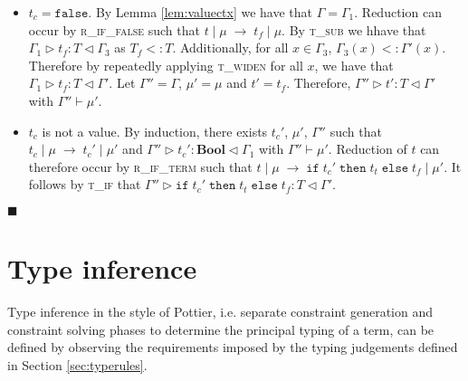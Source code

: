 \documentclass{article}
\newcommand{\lemref}[1]{Lemma \ref{#1}}
\newcommand{\rifexpr}{\textsc{r\_if\_term} }
\newcommand{\riffalse}{\textsc{r\_if\_false} }
\newcommand{\tif}{\textsc{t\_if} }
\newcommand{\tsub}{\textsc{t\_sub} }
\newcommand{\twiden}{\textsc{t\_widen} }
\newcommand{\typerule}[4]{#1 \triangleright #2 : #3 \triangleleft #4}
\newcommand{\oprule}[4]{#1 \mid #2\;\longrightarrow\;#3 \mid #4}
\newcommand{\falsev}{\mathtt{false}}
\newcommand{\boolt}{\mathbf{Bool}}
\newcommand{\ift}[3]{\mathtt{if} \; #1 \; \mathtt{then} \; #2 \; \mathtt{else} \; #3}
\newcommand{\qed}{$\blacksquare$}
\newenvironment{proof}{\vspace{1ex}\noindent{\bf Proof}\hspace{0.5em}}
  {\hfill\qed\vspace{1ex}}
\begin{document}
\begin{proof}
\begin{itemize}
\begin{itemize}
	\item $t_c = \falsev$. By \lemref{lem:valuectx} we have that
	$\Gamma = \Gamma_1$. Reduction can occur by \riffalse such that
	$\oprule{t}{\mu}{t_f}{\mu}$. By \tsub we hhave that
	$\typerule{\Gamma_1}{t_f}{T}{\Gamma_3}$ as $T_f <: T$. Additionally, for
	all $x \in \Gamma_3$, $\Gamma_3(x) <: \Gamma'(x)$. Therefore by
	repeatedly applying \twiden for all $x$, we have that
	$\typerule{\Gamma_1}{t_f}{T}{\Gamma'}$. Let $\Gamma'' = \Gamma$,
	$\mu' = \mu$ and $t' = t_f$. Therefore, 
	$\typerule{\Gamma''}{t'}{T}{\Gamma'}$ with $\Gamma'' \vdash \mu'$.

	\item $t_c$ is not a value. By induction, there exists $t_c'$,
	$\mu'$, $\Gamma''$ such that 
	$\oprule{t_c}{\mu}{t_c'}{\mu'}$ and 
	$\typerule{\Gamma''}{t_c'}{\boolt}{\Gamma_1}$ with $\Gamma'' \vdash \mu'$. 
	Reduction of $t$ can therefore occur by \rifexpr such that
	$\oprule{t}{\mu}{\ift{t_c'}{t_t}{t_f}}{\mu'}$. It follows
	by \tif that $\typerule{\Gamma''}{\ift{t_c'}{t_t}{t_f}}{T}{\Gamma'}$.
	\end{itemize}

\end{itemize}
\end{proof}

\section{Type inference}

Type inference in the style of Pottier, i.e. separate constraint generation
and constraint solving phases to determine the principal typing of a term,
can be defined by observing the requirements imposed by the typing judgements
defined in Section \ref{sec:typerules}.

\ottgrammartabular{
\ottC\ottinterrule
\ottctxc\ottinterrule
\otttyc\ottinterrule
\ottprotoc\ottinterrule
\otttinf\ottinterrule
}
\end{document}
